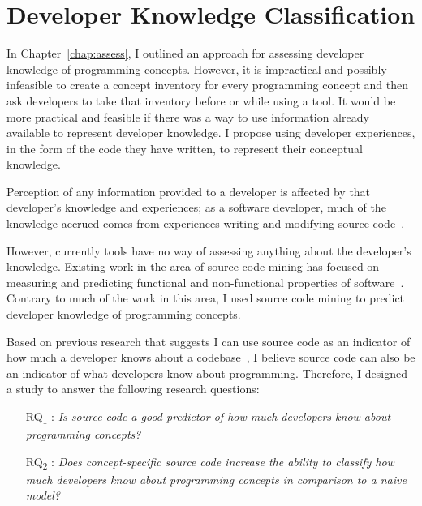 \chapter{Developer Knowledge Classification}
\label{chap:experience}	

In Chapter~\ref{chap:assess}, I outlined an approach for assessing developer knowledge of programming concepts. However, it is impractical and possibly infeasible to create a concept inventory for every programming concept and then ask developers to take that inventory before or while using a tool. It would be more practical and feasible if there was a way to use information already available to represent developer knowledge. I propose using developer experiences, in the form of the code they have written, to represent their conceptual knowledge. 

Perception of any information provided to a developer is affected by that developer's knowledge and experiences; as a software developer, much of the knowledge accrued comes from experiences writing and modifying source code~\cite{Canas:1994:Mental,raju1995differential,fritz2010degree,argote2011organizational}.

However, currently tools have no way of assessing anything about the developer's knowledge.
Existing work in the area of source code mining has focused on measuring and predicting functional and non-functional properties of software~\cite{heckman2009model,menzies2007data,haapio2011exploring}. 
Contrary to much of the work in this area, I used source code mining to predict developer knowledge of programming concepts.

Based on previous research that suggests I can use source code as an indicator of how much a developer knows about a codebase~\cite{fritz2010degree}, I believe source code can also be an indicator of what developers know about programming.
Therefore, I designed a study to answer the following research questions:

\begin{itemize}
	\item [RQ\textsubscript{1}]: \textit{Is source code a good predictor of how much developers know about programming concepts?}
	\item [RQ\textsubscript{2}]: \textit{Does concept-specific source code increase the ability to classify how much developers know about programming concepts in comparison to a naive model?}
\end{itemize}

